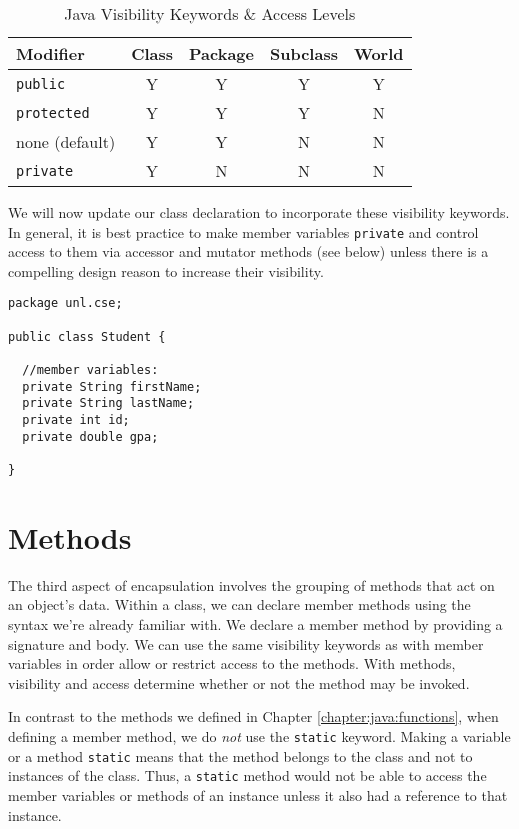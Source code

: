 \begin{table}[h]
\centering
\begin{tabular}{|l|c|c|c|c|}
\hline
Modifier & Class & Package & Subclass & World \\
\hline\hline
\texttt{public} & Y & Y & Y & Y \\
\hline
\texttt{protected} & Y & Y & Y & N \\
\hline
none (default)        & Y & Y & N & N \\
\hline
\texttt{private} & Y & N & N & N \\
\hline
\end{tabular}
\caption{Java Visibility Keywords \& Access Levels}
\label{table:javaVisibilityKeywords}
\end{table}

We will now update our class declaration to incorporate these visibility
keywords.  In general, it is best practice to make member variables 
\texttt{private} and control access to them via accessor and
mutator methods (see below) unless there is a compelling design
reason to increase their visibility.  

\begin{verbatim}
package unl.cse;

public class Student {

  //member variables:
  private String firstName;
  private String lastName;
  private int id;
  private double gpa;

}
\end{verbatim}

\section{Methods}

The third aspect of encapsulation involves the grouping of methods that
act on an object's data.  Within a class, we can declare member methods
using the syntax we're already familiar with.  We declare a member
method by providing a signature and body.  We can use the same visibility
keywords as with member variables in order allow or restrict access
to the methods.  With methods, visibility and access determine whether 
or not the method may be invoked.

In contrast to the methods we defined in Chapter 
\ref{chapter:java:functions}, when defining a member method, we
do \emph{not} use the \texttt{static} keyword.  Making
a variable or a method \texttt{static} means that the 
method belongs to the class and not to instances of the class.  
Thus, a \texttt{static} method would not be able to
access the member variables or methods of an instance unless 
it also had a reference to that instance.  

